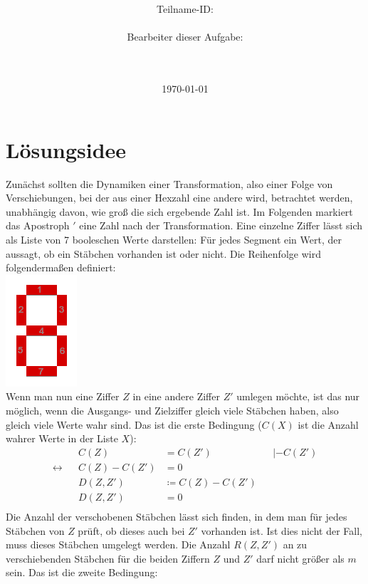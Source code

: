 \documentclass[a4paper,10pt,ngerman]{scrartcl}
\title{\textbf{\Huge\Aufgabe}}
\author{\LARGE Teilname-ID: \LARGE \TeamId \\\\
	    \LARGE Bearbeiter dieser Aufgabe: \\ 
	    \LARGE \Namen\\\\}
\date{\LARGE\today}
\begin{document}
\maketitle
\tableofcontents

\vspace{0.5cm}



\section{Lösungsidee}

Zunächst sollten die Dynamiken einer Transformation, also einer Folge von Verschiebungen, bei der aus einer Hexzahl eine andere wird, betrachtet werden, unabhängig davon, wie groß die sich ergebende Zahl ist. Im Folgenden markiert das Apostroph $'$ eine Zahl nach der Transformation. Eine einzelne Ziffer lässt sich als Liste von 7 booleschen Werte darstellen: Für jedes Segment ein Wert, der aussagt, ob ein Stäbchen vorhanden ist oder nicht. Die Reihenfolge wird folgendermaßen definiert: \\
\includegraphics[scale=4]{ziffereinzel} \\
 Wenn man nun eine Ziffer $Z$ in eine andere Ziffer $Z'$ umlegen möchte, ist das nur möglich, wenn die Ausgangs- und Zielziffer gleich viele Stäbchen haben, also gleich viele Werte wahr sind. Das ist die erste Bedingung ($C(X)$ ist die Anzahl wahrer Werte in der Liste $X$):
\begin{align}
&& C(Z) &= C(Z') && |-C(Z') \\
\leftrightarrow && C(Z) - C(Z') &= 0 && \\
&& D(Z, Z') &\coloneqq C(Z) - C(Z') && \\
&& D(Z, Z') &= 0 && \\
\end{align}
Die Anzahl der verschobenen Stäbchen lässt sich finden, in dem man für jedes Stäbchen von $Z$ prüft, ob dieses auch bei $Z'$ vorhanden ist. Ist dies nicht der Fall, muss dieses Stäbchen umgelegt werden. Die Anzahl $R(Z, Z')$ an zu verschiebenden Stäbchen für die beiden Ziffern $Z$ und $Z'$ darf nicht größer als $m$ sein. Das ist die zweite Bedingung: 
\end{document}
